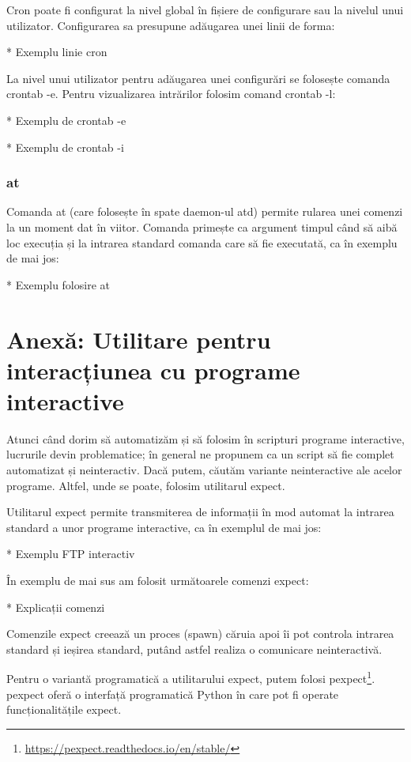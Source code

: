 Cron poate fi configurat la nivel global în fișiere de configurare sau la
nivelul unui utilizator. Configurarea sa presupune adăugarea unei linii de
forma:

* Exemplu linie cron

La nivel unui utilizator pentru adăugarea unei configurări se folosește comanda
crontab -e. Pentru vizualizarea intrărilor folosim comand crontab -l:

* Exemplu de crontab -e

* Exemplu de crontab -i

\subsubsection{at}
\label{sec:auto-infosys-planning-at}

Comanda at (care folosește în spate daemon-ul atd) permite rularea unei comenzi
la un moment dat în viitor. Comanda primește ca argument timpul când să aibă loc
execuția și la intrarea standard comanda care să fie executată, ca în exemplu de
mai jos:

* Exemplu folosire at

\section{Anexă: Utilitare pentru interacțiunea cu programe interactive}
\label{sec:auto-gui}

Atunci când dorim să automatizăm și să folosim în scripturi programe
interactive, lucrurile devin problematice; în general ne propunem ca un script
să fie complet automatizat și neinteractiv. Dacă putem, căutăm variante
neinteractive ale acelor programe. Altfel, unde se poate, folosim utilitarul
expect.

Utilitarul expect permite transmiterea de informații în mod automat la intrarea
standard a unor programe interactive, ca în exemplul de mai jos:

* Exemplu FTP interactiv

În exemplu de mai sus am folosit următoarele comenzi expect:

* Explicații comenzi

Comenzile expect creează un proces (spawn) căruia apoi îi pot controla intrarea
standard și ieșirea standard, putând astfel realiza o comunicare neinteractivă.

Pentru o variantă programatică a utilitarului expect, putem folosi
pexpect\footnote{\url{https://pexpect.readthedocs.io/en/stable/}}. pexpect
oferă o interfață programatică Python în care pot fi operate funcționalitățile
expect.

